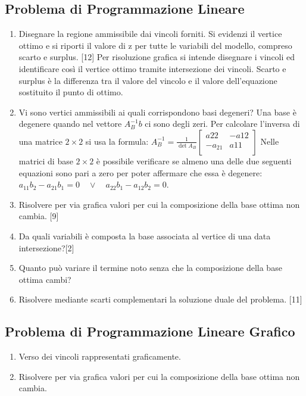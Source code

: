 \documentclass[\main/main.tex]{subfiles}
\begin{document}
\subsection{Problema di Programmazione Lineare}
\begin{enumerate}
  \item Disegnare la regione ammissibile dai vincoli forniti. Si evidenzi il vertice ottimo e si riporti il valore di z per tutte le variabili del modello, compreso scarto e surplus. [12]
        \subitem Per risoluzione grafica si intende disegnare i vincoli ed identificare così il vertice ottimo tramite intersezione dei vincoli.
        \subitem Scarto e surplus è la differenza tra il valore del vincolo e il valore dell'equazione sostituito il punto di ottimo.
  \item Vi sono vertici ammissibili ai quali corrispondono basi degeneri?
        \subitem Una base è degenere quando nel vettore $A_B^{-1}b$ ci sono degli zeri.
        \subitem Per calcolare l'inversa di una matrice $2\times 2$ si usa la formula: $A_B^{-1} = \frac{1}{\det A_B} \begin{bmatrix}
            a{22}   & -a{12} \\
            -a_{21} & a{11}  \\
          \end{bmatrix}$
        \subitem Nelle matrici di base $2 \times 2$ è possibile verificare se almeno una delle due seguenti equazioni sono pari a zero per poter affermare che essa è degenere: $a_{11}b_2 - a_{21}b_1 = 0 \quad \lor \quad a_{22}b_1 - a_{12}b_2 = 0$.
  \item Risolvere per via grafica valori per cui la composizione della base ottima non cambia. [9]
  \item Da quali variabili è composta la base associata al vertice di una data intersezione?[2]
  \item Quanto può variare il termine noto senza che la composizione della base ottima cambi?
  \item Risolvere mediante scarti complementari la soluzione duale del problema. [11]
\end{enumerate}

\subsection{Problema di Programmazione Lineare Grafico}
\begin{enumerate}
  \item Verso dei vincoli rappresentati graficamente.
  \item Risolvere per via grafica valori per cui la composizione della base ottima non cambia.
\end{enumerate}
\end{document}
